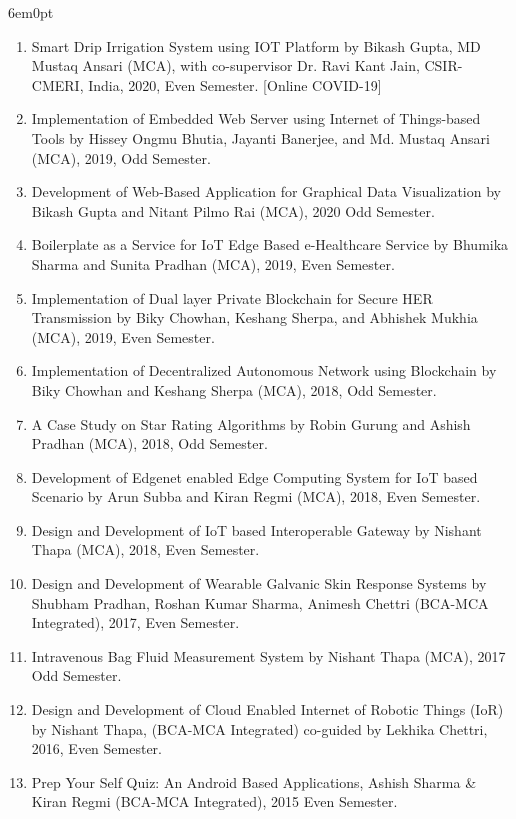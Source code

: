 \documentclass[11pt,a4paper]{moderncv}
\begin{document}
\begin{adjustwidth}{6em}{0pt}
\begin{enumerate}
		\item Smart Drip Irrigation System using IOT Platform by Bikash Gupta, MD Mustaq Ansari (MCA), with co-supervisor Dr. Ravi Kant Jain, CSIR-CMERI, India, 2020, Even Semester. [Online COVID-19]
		
		\item Implementation of Embedded Web Server using Internet of Things-based Tools by Hissey Ongmu Bhutia, Jayanti Banerjee, and Md. Mustaq Ansari (MCA), 2019, Odd Semester.
		
		\item Development of Web-Based Application for Graphical Data Visualization by Bikash Gupta and Nitant Pilmo Rai (MCA), 2020 Odd Semester.
		
		\item Boilerplate as a Service for IoT Edge Based e-Healthcare Service by Bhumika Sharma and Sunita Pradhan (MCA), 2019, Even Semester.
		
		\item Implementation of Dual layer Private Blockchain for Secure HER Transmission by Biky Chowhan, Keshang Sherpa, and Abhishek Mukhia (MCA), 2019, Even Semester.
		
		\item Implementation of Decentralized Autonomous Network using Blockchain by Biky Chowhan and Keshang Sherpa (MCA), 2018, Odd Semester.
		
		\item A Case Study on Star Rating Algorithms by Robin Gurung and Ashish Pradhan (MCA), 2018, Odd  Semester.
		
		\item Development of Edgenet enabled Edge Computing System for IoT based Scenario by Arun Subba and Kiran Regmi (MCA), 2018, Even Semester.
		
		\item Design and Development of IoT based Interoperable Gateway by Nishant Thapa (MCA), 2018, Even Semester.
		
		\item Design and Development of Wearable Galvanic Skin Response Systems by Shubham Pradhan, Roshan Kumar Sharma, Animesh Chettri (BCA-MCA Integrated), 2017, Even Semester.
		
		\item Intravenous Bag Fluid Measurement System by Nishant Thapa (MCA), 2017 Odd Semester.
		
		\item Design and Development of Cloud Enabled Internet of Robotic Things (IoR) by Nishant Thapa, (BCA-MCA Integrated) co-guided by Lekhika Chettri, 2016, Even Semester.
		
		\item Prep Your Self Quiz: An Android Based Applications, Ashish Sharma \& Kiran Regmi (BCA-MCA Integrated), 2015 Even Semester.
		
		
	\end{enumerate}
\end{adjustwidth}
\end{document}
